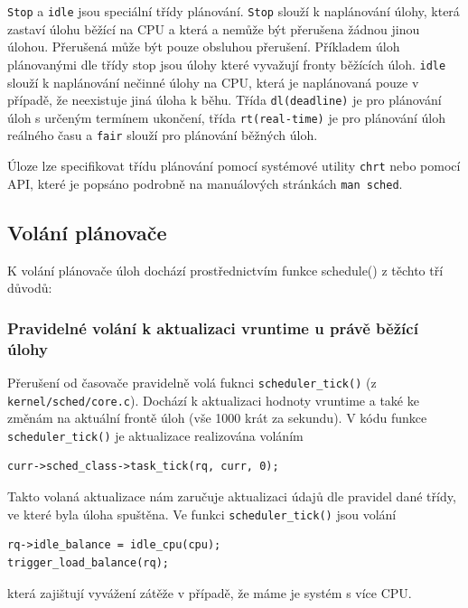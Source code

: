 \documentclass[
  master=true,
  font=sans,
  printversion=false,
  joinlists=true,
  figures=true,
  tables=true,
  sourcecodes=false,
  theorems=false,
  bibencoding=utf8,
  language=czech,
  encoding=utf8,
  field=ainfk,
  biblatex,
  glossaries,
  index
]{kidiplom}
\begin{document}
\verb#Stop# a \verb#idle# jsou speciální třídy plánování. \verb#Stop# slouží k naplánování úlohy, která zastaví úlohu běžící na CPU a která a nemůže být přerušena žádnou jinou úlohou. Přerušená může být pouze obsluhou přerušení. Příkladem úloh plánovanými dle třídy stop jsou úlohy které vyvažují fronty běžících úloh. \verb#idle# slouží k naplánování nečinné úlohy na CPU, která je naplánovaná pouze v případě, že neexistuje jiná úloha k běhu. Třída \verb#dl(deadline)# je pro plánování úloh s určeným termínem ukončení, třída \verb#rt(real-time)# je pro plánování úloh reálného času a \verb#fair# slouží pro plánování běžných úloh.

Úloze lze specifikovat třídu plánování pomocí systémové utility \verb#chrt# nebo pomocí API, které je popsáno podrobně na manuálových stránkách \verb#man sched#.

\subsection{Volání plánovače}

K volání plánovače úloh dochází prostřednictvím funkce schedule() z těchto tří důvodů:

\subsubsection{Pravidelné volání k aktualizaci vruntime u právě běžící úlohy}

Přerušení od časovače pravidelně volá fuknci \verb#scheduler_tick()# \linebreak (z \verb#kernel/sched/core.c#). Dochází k aktualizaci hodnoty vruntime a také ke změnám na aktuální frontě úloh (vše 1000 krát za sekundu). V kódu funkce \newline \verb#scheduler_tick()# je aktualizace realizována voláním 
\begin{verbatim}
curr->sched_class->task_tick(rq, curr, 0);
\end{verbatim}
Takto volaná aktualizace nám zaručuje aktualizaci údajů dle pravidel dané třídy, ve které byla úloha spuštěna. Ve funkci \verb#scheduler_tick()# jsou volání 
\begin{verbatim}
rq->idle_balance = idle_cpu(cpu);
trigger_load_balance(rq);
\end{verbatim}
která zajištují vyvážení zátěže v případě, že máme je systém s více CPU.
\end{document}
